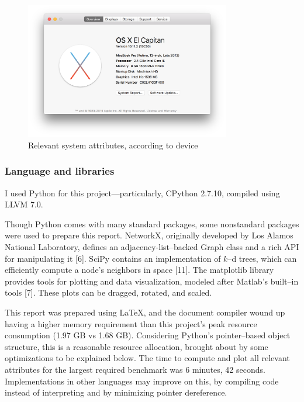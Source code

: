 \documentclass[oneside, titlepage]{scrartcl}
\begin{document}
\begin{figure}[h!]
\centering
\includegraphics[width=0.8\textwidth]{figures/device_environment}
\caption{Relevant system attributes, according to device}
\label{fig:system}
\end{figure}

\subsubsection{Language and libraries}
I used Python for this project---particularly, CPython 2.7.10, compiled using LLVM 7.0.

Though Python comes with many standard packages, some nonstandard packages were used to prepare this report. NetworkX, originally developed by Los Alamos National Laboratory, defines an adjacency-list--backed Graph class and a rich API for manipulating it [6]. SciPy contains an implementation of $k$--d trees, which can efficiently compute a node's neighbors in space [11]. The matplotlib library provides tools for plotting and data visualization, modeled after Matlab's built--in tools [7]. These plots can be dragged, rotated, and scaled.

This report was prepared using \LaTeX, and the document compiler wound up having a higher memory requirement than this project's peak resource consumption (1.97 GB vs 1.68 GB). Considering Python's pointer--based object structure, this is a reasonable resource allocation, brought about by some optimizations to be explained below. The time to compute and plot all relevant attributes for the largest required benchmark was 6 minutes, 42 seconds. Implementations in other languages may improve on this, by compiling code instead of interpreting and by minimizing pointer dereference.
\end{document}
